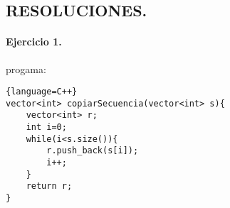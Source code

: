 \documentclass{article}
\begin{document}


\begin{center}
\section*{RESOLUCIONES.}
\end{center}
\paragraph{Ejercicio 1.}progama:

\begin{lstlisting}{language=C++}
vector<int> copiarSecuencia(vector<int> s){
	vector<int> r;
	int i=0;
	while(i<s.size()){
		r.push_back(s[i]);
		i++;	
	}
	return r;
}
\end{lstlisting}
\end{document}
